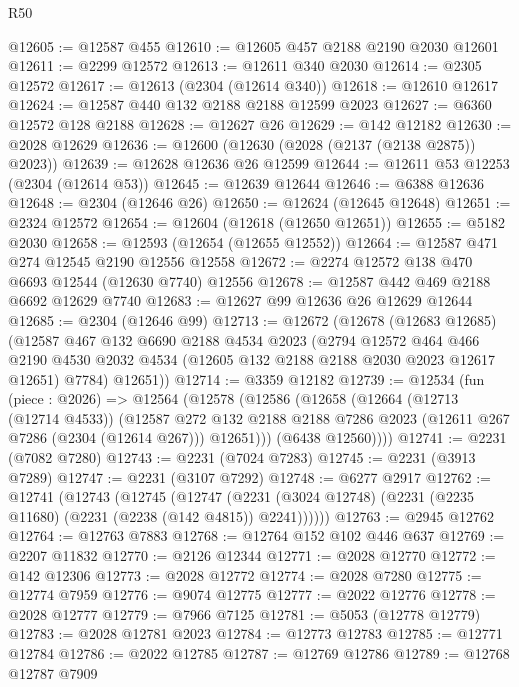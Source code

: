 \begin{lexlean}{R50}
\begin{coremodule}
@12605 := @12587 @455
@12610 := @12605 @457 @2188 @2190 @2030 @12601
@12611 := @2299 @12572
@12613 := @12611 @340 @2030
@12614 := @2305 @12572
@12617 := @12613 (@2304 (@12614 @340))
@12618 := @12610 @12617
@12624 := @12587 @440 @132 @2188 @2188 @12599 @2023
@12627 := @6360 @12572 @128 @2188
@12628 := @12627 @26
@12629 := @142 @12182
@12630 := @2028 @12629
@12636 := @12600 (@12630 (@2028 (@2137 (@2138 @2875)) @2023))
@12639 := @12628 @12636 @26 @12599
@12644 := @12611 @53 @12253 (@2304 (@12614 @53))
@12645 := @12639 @12644
@12646 := @6388 @12636
@12648 := @2304 (@12646 @26)
@12650 := @12624 (@12645 @12648)
@12651 := @2324 @12572
@12654 := @12604 (@12618 (@12650 @12651))
@12655 := @5182 @2030
@12658 := @12593 (@12654 (@12655 @12552))
@12664 := @12587 @471 @274 @12545 @2190 @12556 @12558
@12672 := @2274 @12572 @138 @470 @6693 @12544 (@12630 @7740) @12556
@12678 := @12587 @442 @469 @2188 @6692 @12629 @7740
@12683 := @12627 @99 @12636 @26 @12629 @12644
@12685 := @2304 (@12646 @99)
@12713 := @12672
    (@12678
      (@12683 @12685)
      (@12587
        @467
        @132
        @6690
        @2188
        @4534
        @2023
        (@2794
          @12572
          @464
          @466
          @2190
          @4530
          @2032
          @4534
          (@12605 @132 @2188 @2188 @2030 @2023 @12617 @12651)
          @7784)
        @12651))
@12714 := @3359 @12182
@12739 := @12534
    (fun (piece : @2026) =>
    @12564
      (@12578
        (@12586
          (@12658
            (@12664
              (@12713 (@12714 @4533))
              (@12587
                @272
                @132
                @2188
                @2188
                @7286
                @2023
                (@12611 @267 @7286 (@2304 (@12614 @267)))
                @12651)))
          (@6438 @12560))))
@12741 := @2231 (@7082 @7280)
@12743 := @2231 (@7024 @7283)
@12745 := @2231 (@3913 @7289)
@12747 := @2231 (@3107 @7292)
@12748 := @6277 @2917
@12762 := @12741
    (@12743
      (@12745
        (@12747 (@2231 (@3024 @12748) (@2231 (@2235 @11680) (@2231 (@2238 (@142 @4815)) @2241))))))
@12763 := @2945 @12762
@12764 := @12763 @7883
@12768 := @12764 @152 @102 @446 @637
@12769 := @2207 @11832
@12770 := @2126 @12344
@12771 := @2028 @12770
@12772 := @142 @12306
@12773 := @2028 @12772
@12774 := @2028 @7280
@12775 := @12774 @7959
@12776 := @9074 @12775
@12777 := @2022 @12776
@12778 := @2028 @12777
@12779 := @7966 @7125
@12781 := @5053 (@12778 @12779)
@12783 := @2028 @12781 @2023
@12784 := @12773 @12783
@12785 := @12771 @12784
@12786 := @2022 @12785
@12787 := @12769 @12786
@12789 := @12768 @12787 @7909

\end{coremodule}
\end{lexlean}
